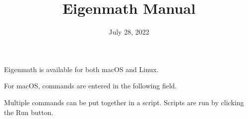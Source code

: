 \documentclass[12pt]{article}
\title{Eigenmath Manual}
\date{July 28, 2022}
\author{}
\begin{document}
\maketitle

\tableofcontents

\newpage

Eigenmath is available for both macOS and Linux.

\bigskip
For macOS, commands are entered in the following field.

\begin{center}
\end{center}

Multiple commands can be put together in a script.
Scripts are run by clicking the Run button.

\begin{center}
\end{center}
\end{document}
